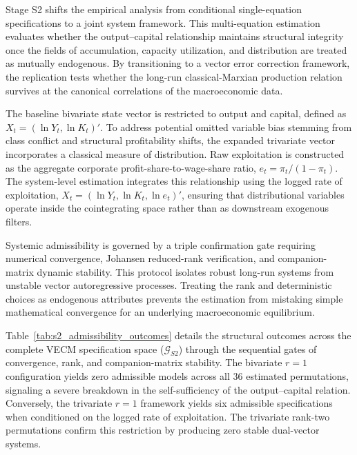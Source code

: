 \documentclass[11pt]{article}
\begin{document}
Stage S2 shifts the empirical analysis from conditional single-equation specifications to a joint system framework. This multi-equation estimation evaluates whether the output--capital relationship maintains structural integrity once the fields of accumulation, capacity utilization, and distribution are treated as mutually endogenous. By transitioning to a vector error correction framework, the replication tests whether the long-run classical-Marxian production relation survives at the canonical correlations of the macroeconomic data.

The baseline bivariate state vector is restricted to output and capital, defined as $X_t=(\ln Y_t,\ln K_t)'$. To address potential omitted variable bias stemming from class conflict and structural profitability shifts, the expanded trivariate vector incorporates a classical measure of distribution. Raw exploitation is constructed as the aggregate corporate profit-share-to-wage-share ratio, $e_t=\pi_t/(1-\pi_t)$. The system-level estimation integrates this relationship using the logged rate of exploitation, $X_t=(\ln Y_t,\ln K_t,\ln e_t)'$, ensuring that distributional variables operate inside the cointegrating space rather than as downstream exogenous filters.

Systemic admissibility is governed by a triple confirmation gate requiring numerical convergence, Johansen reduced-rank verification, and companion-matrix dynamic stability. This protocol isolates robust long-run systems from unstable vector autoregressive processes. Treating the rank and deterministic choices as endogenous attributes prevents the estimation from mistaking simple mathematical convergence for an underlying macroeconomic equilibrium.

Table~\ref{tab:s2_admissibility_outcomes} details the structural outcomes across the complete VECM specification space ($\mathcal{G}_{S2}$) through the sequential gates of convergence, rank, and companion-matrix stability. The bivariate $r=1$ configuration yields zero admissible models across all 36 estimated permutations, signaling a severe breakdown in the self-sufficiency of the output--capital relation. Conversely, the trivariate $r=1$ framework yields six admissible specifications when conditioned on the logged rate of exploitation. The trivariate rank-two permutations confirm this restriction by producing zero stable dual-vector systems.
\end{document}
